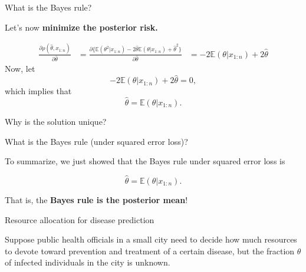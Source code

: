 \documentclass[
  ignorenonframetext,
]{beamer}
\newcommand{\E}{\mathbb{E}}
\begin{document}
\begin{frame}{What is the Bayes rule?}
\protect\hypertarget{what-is-the-bayes-rule}{}

Let's now \textbf{minimize the posterior risk.}

\begin{align*}
\frac{\partial \rho(\hat\theta,x_{1:n})}{\partial \hat{\theta}}
&= \frac{\partial \{\E(\theta^2|x_{1:n}) - 2\hat\theta\E(\theta|x_{1:n}) +\hat\theta^2\}}{\partial \hat{\theta}}
&= -2 \E(\theta|x_{1:n}) + 2 \hat{\theta}
\end{align*} Now, let \[ -2 \E(\theta|x_{1:n}) + 2 \hat{\theta} = 0, \]
which implies that \[\hat{\theta} = \E(\theta|x_{1:n}).\]

Why is the solution unique?

\end{frame}

\begin{frame}{What is the Bayes rule (under squared error loss)?}
\protect\hypertarget{what-is-the-bayes-rule-under-squared-error-loss}{}

To summarize, we just showed that the Bayes rule under squared error
loss is

\[\hat{\theta} = \E(\theta|x_{1:n}).\] \vspace*{1em}

That is, the \textbf{Bayes rule is the posterior mean}!

\end{frame}

\begin{frame}{Resource allocation for disease prediction}
\protect\hypertarget{resource-allocation-for-disease-prediction}{}

Suppose public health officials in a small city need to decide how much
resources to devote toward prevention and treatment of a certain
disease, but the fraction \(\theta\) of infected individuals in the city
is unknown.

\end{frame}
\end{document}
